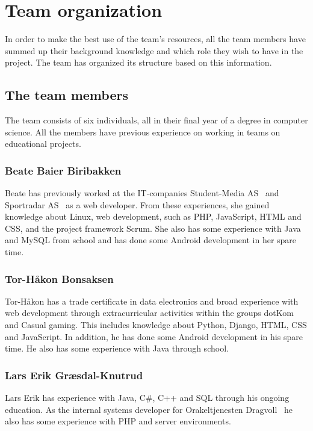 \section{Team organization}
In order to make the best use of the team's resources, all the team members have summed up their background knowledge and which role they wish to have in the project. The team has organized its structure based on this information.

\subsection{The team members}
The team consists of six individuals, all in their final year of a degree in computer science. All the members have previous experience on working in teams on educational projects.

\subsubsection{Beate Baier Biribakken}
Beate has previously worked at the IT-companies Student-Media AS~\cite{studentmedia} and Sportradar AS~\cite{sportradar} as a web developer. From these experiences, she gained knowledge about Linux, web development, such as PHP, JavaScript, HTML and CSS, and the project framework Scrum. She also has some experience with Java and MySQL from school and has done some Android development in her spare time.

\subsubsection{Tor-Håkon Bonsaksen}
Tor-Håkon has a trade certificate in data electronics and broad experience with web development through extracurricular activities within the groups dotKom~\cite{dotkom} and Casual gaming\cite{casualgaming}. This includes knowledge about Python, Django, HTML, CSS and JavaScript. In addition, he has done some Android development in his spare time. He also has some experience with Java through school.

\subsubsection{Lars Erik Græsdal-Knutrud}
Lars Erik has experience with Java, C\#, C++ and SQL through his ongoing education. As the internal systems developer for Orakeltjenesten Dragvoll~\cite{orakeltjenesten} he also has some experience with PHP and server environments. 

